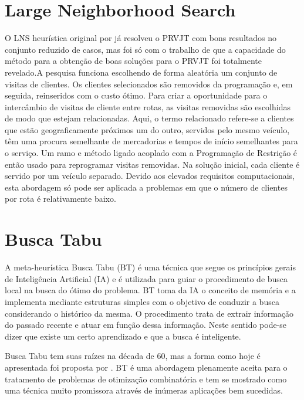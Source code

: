  



\section{Large Neighborhood Search}


 O LNS heurística original por \cite{shaw98} já resolveu o PRVJT com bons resultados no conjunto reduzido de casos, mas foi só com o trabalho de \cite{bent04} que a capacidade do método para a obtenção de boas soluções para o PRVJT foi totalmente revelado.A pesquisa funciona escolhendo de forma aleatória um conjunto de visitas de clientes. Os clientes selecionados são removidos da programação e, em seguida, reinseridos com o custo ótimo. Para criar a oportunidade para o intercâmbio de visitas de cliente entre rotas, as visitas removidas são escolhidas de modo que estejam relacionadas. Aqui, o termo relacionado refere-se a clientes que estão geograficamente próximos um do outro, servidos pelo mesmo veículo, têm uma procura semelhante de mercadorias e tempos de início semelhantes para o serviço. Um ramo e método ligado acoplado com a Programação de Restrição é então usado para reprogramar visitas removidas. Na solução inicial, cada cliente é servido por um veículo separado. Devido aos elevados requisitos computacionais, esta abordagem só pode ser aplicada a problemas em que o número de clientes por rota é relativamente baixo.
 
 
\section{Busca Tabu}
 
A meta-heurística Busca Tabu (BT) é uma técnica que segue os princípios gerais de Inteligência Artificial (IA) e é utilizada para guiar o procedimento de busca local na busca do ótimo do problema. BT toma da IA o conceito de memória e a implementa mediante estruturas simples com o objetivo de conduzir a busca considerando o histórico da mesma. O procedimento trata de extrair informação do passado recente e atuar em função dessa informação. Neste sentido pode-se dizer que existe um certo aprendizado e que a busca é inteligente. 


Busca Tabu tem suas raízes na década de 60, mas a forma como hoje é apresentada foi proposta por \cite{glover97}. BT é uma abordagem plenamente aceita para o tratamento de problemas de otimização combinatória e tem se mostrado como uma técnica muito promissora através de inúmeras aplicações bem sucedidas. 

